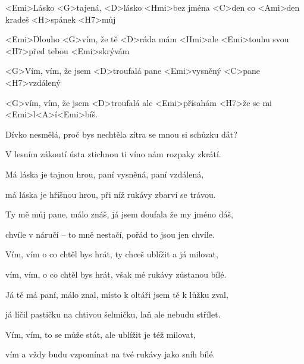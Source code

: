 

\zs
<Emi>Lásko <G>tajená, <D>lásko <Hmi>bez jména 
<C>den co <Ami>den kradeš <H>spánek <H7>můj

<Emi>Dlouho <G>vím, že tě <D>ráda mám 
<Hmi>ale <Emi>touhu svou <H7>před tebou <Emi>skrývám

<G>Vím, vím, že jsem <D>troufalá pane <Emi>vysněný <C>pane <H7>vzdálený

<G>vím, vím, že jsem <D>troufalá 
ale <Emi>přísahám <H7>že se mi <Emi>l<A>í<Emi>bíš.
\ks

\zs
Dívko nesmělá, proč bys nechtěla zítra se mnou si schůzku dát?

V lesním zákoutí ústa ztichnou ti víno nám rozpaky zkrátí.

Má láska je tajnou hrou, paní vysněná, paní vzdálená,

má láska je hříšnou hrou, při níž rukávy zbarví se trávou. 
\ks

\zs
Ty mě můj pane, málo znáš, já jsem doufala že my jméno dáš,

chvíle v náručí -- to mně nestačí, pořád to jsou jen chvíle.

Vím, vím o co chtěl bys hrát, ty chceš ublížit a já milovat, 

vím, vím, o co chtěl bys hrát, však mé rukávy zůstanou bílé.
\ks

\zs
Já tě má paní, málo znal, místo k oltáři jsem tě k lůžku zval,

já líčil pastičku na chtivou šelmičku, laň ale nebudu střílet. 

Vím, vím, to se může stát, ale ublížit je též milovat,

vím a vždy budu vzpomínat na tvé rukávy jako sníh bílé.
\ks

\kp
